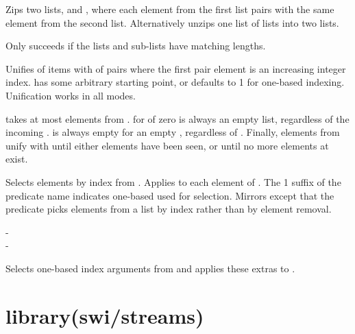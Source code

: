 \begin{description}
Zips two lists,  and , where each element from the first
list pairs with the same element from the second list. Alternatively
unzips one list of lists into two lists.

Only succeeds if the lists and sub-lists have matching lengths.

\nodescription
Unifies  of items with  of pairs where the first pair
element is an increasing integer index.  has some arbitrary
starting point, or defaults to 1 for one-based indexing. Unification
works in all modes.

 takes at most  elements from .  for  of
zero is always an empty list, regardless of the incoming . 
is always empty for an empty , regardless of . Finally,
elements from  unify with  until either  elements
have been seen, or until no more elements at  exist.

Selects  elements by index from . Applies  to each
element of . The 1 suffix of the predicate name indicates
one-based  used for selection. Mirrors  except that
the predicate picks elements from a list by index rather than by
element removal.

\begin{tags}
-  \\- 
\end{tags}

Selects one-based index arguments from  and applies these
extras to .

\begin{tags}
\end{tags}
\end{description}

\chapter{library(swi/streams)}\label{sec:streams}

